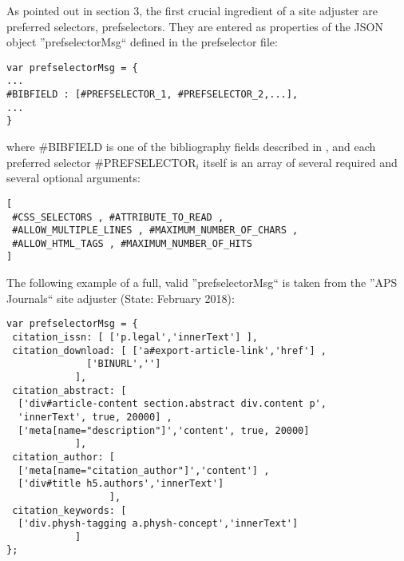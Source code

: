 \documentclass[
a4paper,
12pt,
]
{article}
\begin{document}
As pointed out in section 3, the first crucial ingredient of a site adjuster are preferred selectors, prefselectors. They are entered as properties of the JSON object ''prefselectorMsg`` defined in the prefselector file:
  \begin{center}
  \begin{lstlisting}
var prefselectorMsg = {
...
#BIBFIELD : [#PREFSELECTOR_1, #PREFSELECTOR_2,...],
...
}
\end{lstlisting}
\end{center}
where \#BIBFIELD is one of the bibliography fields described in , and each preferred selector \#PREFSELECTOR$_i$ itself is an array of several required and several optional arguments:
\begin{center}
\begin{lstlisting}
[
 #CSS_SELECTORS , #ATTRIBUTE_TO_READ ,
 #ALLOW_MULTIPLE_LINES , #MAXIMUM_NUMBER_OF_CHARS , 
 #ALLOW_HTML_TAGS , #MAXIMUM_NUMBER_OF_HITS
]
\end{lstlisting}
\end{center}
The following example of a full, valid ''prefselectorMsg`` is taken from the ''APS Journals`` site adjuster (State: February 2018):
\begin{center}
\begin{lstlisting}
var prefselectorMsg = { 
 citation_issn: [ ['p.legal','innerText'] ],
 citation_download: [ ['a#export-article-link','href'] , 
		      ['BINURL','']
		    ],
 citation_abstract: [ 
  ['div#article-content section.abstract div.content p',
  'innerText', true, 20000] , 
  ['meta[name="description"]','content', true, 20000] 
		    ],
 citation_author: [ 
  ['meta[name="citation_author"]','content'] , 
  ['div#title h5.authors','innerText'] 
                  ],
 citation_keywords: [
  ['div.physh-tagging a.physh-concept','innerText'] 
		    ]
};
\end{lstlisting}
\end{center}
\end{document}
